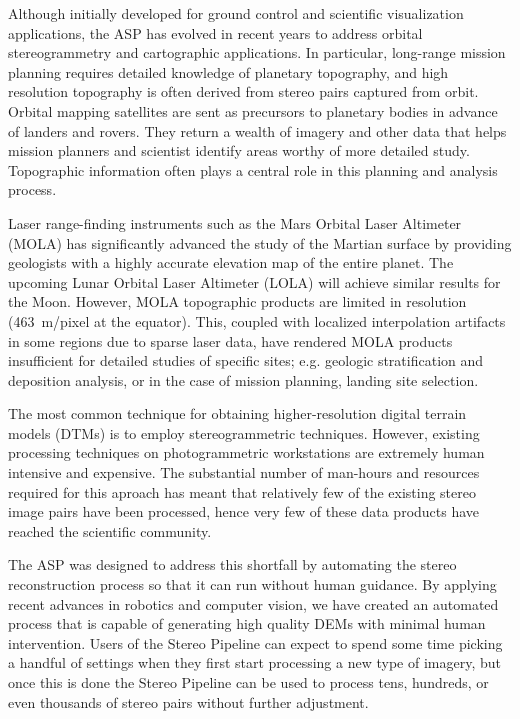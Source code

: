 Although initially developed for ground control and scientific
visualization applications, the ASP has evolved in recent years to
address orbital stereogrammetry and cartographic applications.  In
particular, long-range mission planning requires detailed knowledge of
planetary topography, and high resolution topography is often derived
from stereo pairs captured from orbit.  Orbital mapping satellites are
sent as precursors to planetary bodies in advance of landers and
rovers.  They return a wealth of imagery and other data that helps
mission planners and scientist identify areas worthy of more detailed
study. Topographic information often plays a central role in this
planning and analysis process.

Laser range-finding instruments such as the Mars Orbital Laser
Altimeter (MOLA) \citep{1992JGR....97.7781Z,2001JGR...10623689S}
has signiﬁcantly advanced the study of the Martian surface by
providing geologists with a highly accurate elevation map of the
entire planet.  The upcoming Lunar Orbital Laser Altimeter (LOLA)
\citep{2008AGUFM.P31B1419N,2007SSRv..129..391C} will achieve similar
results for the Moon.  However, MOLA topographic products are limited
in resolution (463~m/pixel at the equator).  This, coupled with
localized interpolation artifacts in some regions due to sparse
laser data, have rendered MOLA products insufficient for detailed
studies of speciﬁc sites; e.g. geologic stratification and deposition
analysis, or in the case of mission planning, landing site selection.

The most common technique for obtaining higher-resolution digital
terrain models (DTMs) is to employ stereogrammetric techniques.
However, existing processing techniques on photogrammetric
workstations are extremely human intensive and expensive.  The
substantial number of man-hours and resources required for this
aproach has meant that relatively few of the existing stereo image
pairs have been processed, hence very few of these data products have
reached the scientiﬁc community.

The ASP was designed to address this shortfall by automating the
stereo reconstruction process so that it can run without human
guidance.  By applying recent advances in robotics and computer
vision, we have created an automated process that is capable of
generating high quality DEMs with minimal human intervention.  Users
of the Stereo Pipeline can expect to spend some time picking a handful
of settings when they first start processing a new type of imagery,
but once this is done the Stereo Pipeline can be used to process tens,
hundreds, or even thousands of stereo pairs without further
adjustment.


